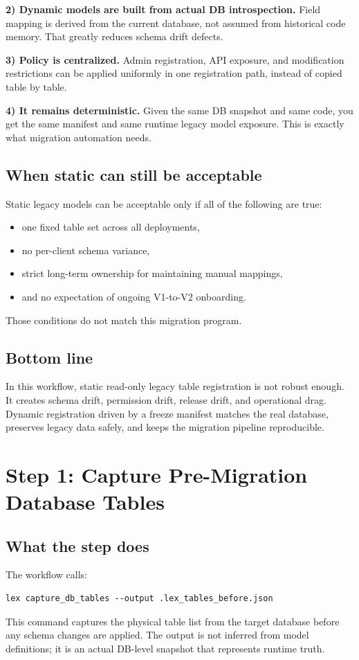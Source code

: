\documentclass[11pt,a4paper]{article}
\begin{document}
\textbf{2) Dynamic models are built from actual DB introspection.}
Field mapping is derived from the current database, not assumed from historical code memory.
That greatly reduces schema drift defects.

\textbf{3) Policy is centralized.}
Admin registration, API exposure, and modification restrictions can be applied uniformly in
one registration path, instead of copied table by table.

\textbf{4) It remains deterministic.}
Given the same DB snapshot and same code, you get the same manifest and same runtime legacy
model exposure. This is exactly what migration automation needs.

\subsection*{When static can still be acceptable}
Static legacy models can be acceptable only if all of the following are true:
\begin{itemize}[leftmargin=1.5em]
  \item one fixed table set across all deployments,
  \item no per-client schema variance,
  \item strict long-term ownership for maintaining manual mappings,
  \item and no expectation of ongoing V1-to-V2 onboarding.
\end{itemize}
Those conditions do not match this migration program.

\subsection*{Bottom line}
In this workflow, static read-only legacy table registration is not robust enough. It creates
schema drift, permission drift, release drift, and operational drag. Dynamic registration
driven by a freeze manifest matches the real database, preserves legacy data safely, and
keeps the migration pipeline reproducible.

\newpage
\section{Step 1: Capture Pre-Migration Database Tables}
\subsection*{What the step does}
The workflow calls:
\begin{verbatim}
lex capture_db_tables --output .lex_tables_before.json
\end{verbatim}
This command captures the physical table list from the target database before any
schema changes are applied. The output is not inferred from model definitions; it is
an actual DB-level snapshot that represents runtime truth.
\end{document}
